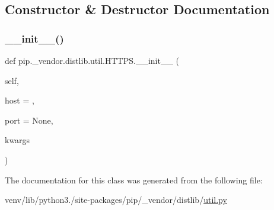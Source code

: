 \subsection{Constructor \& Destructor Documentation}
\mbox{\label{classpip_1_1__vendor_1_1distlib_1_1util_1_1HTTPS_a01143eaf750c0541f8fa125b90e81eda}} 
\subsubsection{\texorpdfstring{\+\_\+\+\_\+init\+\_\+\+\_\+()}{\_\_init\_\_()}}
{\footnotesize\ttfamily def pip.\+\_\+vendor.\+distlib.\+util.\+H\+T\+T\+P\+S.\+\_\+\+\_\+init\+\_\+\+\_\+ (\begin{DoxyParamCaption}\item[{}]{self,  }\item[{}]{host = {\ttfamily \textquotesingle{}\textquotesingle{}},  }\item[{}]{port = {\ttfamily None},  }\item[{}]{kwargs }\end{DoxyParamCaption})}



The documentation for this class was generated from the following file\+:\begin{DoxyCompactItemize}
\item 
venv/lib/python3./site-\/packages/pip/\+\_\+vendor/distlib/\hyperlink{pip_2__vendor_2distlib_2util_8py}{util.\+py}\end{DoxyCompactItemize}
